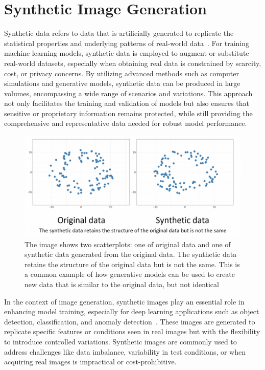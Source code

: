 \documentclass[12pt,DIV14,BCOR12mm,a4paper,footinclude=false,headinclude,parskip=half-,twoside,openright,cleardoublepage=empty,toc=index,bibliography=totoc,listof=totoc]{scrreprt}
\numberwithin{equation}{chapter}
\begin{document}
\section{Synthetic Image Generation}
Synthetic data refers to data that is artificially generated to replicate the statistical properties and underlying patterns of real-world data~\cite{raghunathan2021synthetic}. For training machine learning models, synthetic data is employed to augment or substitute real-world datasets, especially when obtaining real data is constrained by scarcity, cost, or privacy concerns. By utilizing advanced methods such as computer simulations and generative models, synthetic data can be produced in large volumes, encompassing a wide range of scenarios and variations. This approach not only facilitates the training and validation of models but also ensures that sensitive or proprietary information remains protected, while still providing the comprehensive and representative data needed for robust model performance.
\begin{figure}
	\centering
	\includegraphics[scale=.3]{../media/synthetic_data_image-1536x718.png}
	\caption{The image shows two scatterplots: one of original data and one of synthetic data generated from the original data. The synthetic data retains the structure of the original data but is not the same. This is a common example of how generative models can be used to create new data that is similar to the original data, but not identical~\cite{Karen:2020}}
	\label{synthetic_data}
\end{figure}
In the context of image generation, synthetic images play an essential role in enhancing model training, especially for deep learning applications such as object detection, classification, and anomaly detection~\cite{anderson2022synthetic}. These images are generated to replicate specific features or conditions seen in real images but with the flexibility to introduce controlled variations. Synthetic images are commonly used to address challenges like data imbalance, variability in test conditions, or when acquiring real images is impractical or cost-prohibitive.
\end{document}
